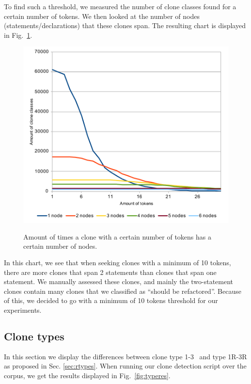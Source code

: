 \documentclass[a4paper]{article}
\begin{document}
To find such a threshold, we measured the number of clone classes found for a certain number of tokens. We then looked at the number of nodes (statements/declarations) that these clones span. The resulting chart is displayed in Fig.~\ref{fig:tokenthreshold}.

\begin{figure}[H]
  \caption{Amount of times a clone with a certain number of tokens has a certain number of nodes.}
    \includegraphics[width=1\columnwidth]{img/TokenThreshold}
  \label{fig:tokenthreshold}
\end{figure}

In this chart, we see that when seeking clones with a minimum of 10 tokens, there are more clones that span 2 statements than clones that span one statement. We manually assessed these clones, and mainly the two-statement clones contain many clones that we classified as ``should be refactored''. Because of this, we decided to go with a minimum of 10 tokens threshold for our experiments.

\subsection{Clone types}\label{sec:clonetypeexperiments}
In this section we display the differences between clone type 1-3~\cite{roy2007survey} and type 1R-3R as proposed in Sec. \ref{sec:rtypes}. When running our clone detection script over the corpus, we get the results displayed in Fig.~\ref{fig:typeres}.
\end{document}
